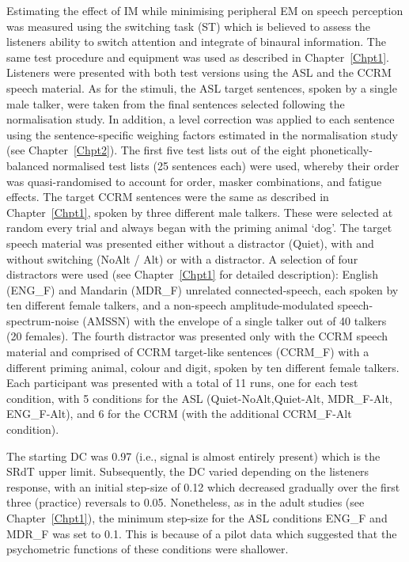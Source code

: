 \documentclass[a4paper, twoside]{templates/ociamthesis}
\begin{document}
\hfill\break
Estimating the effect of IM while minimising peripheral EM on speech perception was measured using the switching task (ST) which is believed to assess the listeners ability to switch attention and integrate of binaural information. The same test procedure and equipment was used as described in Chapter~\ref{Chpt1}. Listeners were presented with both test versions using the ASL and the CCRM speech material. As for the stimuli, the ASL target sentences, spoken by a single male talker, were taken from the final sentences selected following the normalisation study. In addition, a level correction was applied to each sentence using the sentence-specific weighing factors estimated in the normalisation study (see Chapter~\ref{Chpt2}). The first five test lists out of the eight phonetically-balanced normalised test lists (25 sentences each) were used, whereby their order was quasi-randomised to account for order, masker combinations, and fatigue effects. The target CCRM sentences were the same as described in Chapter~\ref{Chpt1}, spoken by three different male talkers. These were selected at random every trial and always began with the priming animal `dog'. The target speech material was presented either without a distractor (Quiet), with and without switching (NoAlt / Alt) or with a distractor. A selection of four distractors were used (see Chapter~\ref{Chpt1} for detailed description): English (ENG\_F) and Mandarin (MDR\_F) unrelated connected-speech, each spoken by ten different female talkers, and a non-speech amplitude-modulated speech-spectrum-noise (AMSSN) with the envelope of a single talker out of 40 talkers (20 females). The fourth distractor was presented only with the CCRM speech material and comprised of CCRM target-like sentences (CCRM\_F) with a different priming animal, colour and digit, spoken by ten different female talkers. Each participant was presented with a total of 11 runs, one for each test condition, with 5 conditions for the ASL (Quiet-NoAlt,Quiet-Alt, MDR\_F-Alt, ENG\_F-Alt), and 6 for the CCRM (with the additional CCRM\_F-Alt condition).

\begin{correction}
The starting DC was 0.97 (i.e., signal is almost entirely present) which
is the SRdT upper limit. Subsequently, the DC varied depending on the
listeners response, with an initial step-size of 0.12 which decreased
gradually over the first three (practice) reversals to 0.05.
Nonetheless, as in the adult studies (see Chapter~\ref{Chpt1}), the
minimum step-size for the ASL conditions ENG\_F and MDR\_F was set to
0.1. This is because of a pilot data which suggested that the
psychometric functions of these conditions were shallower.
\end{correction}
\end{document}
